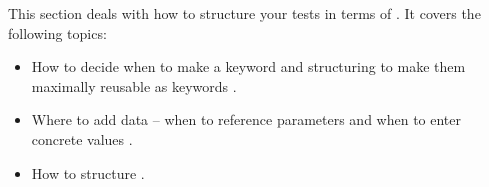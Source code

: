 This section deals with how to structure your tests in terms of . It covers the following topics:

\begin{itemize}
\item How to decide when to make a keyword and structuring \gdcases{} to make them maximally reusable as keywords .
\item Where to add data -- when to reference parameters and when to enter concrete values . 
\item How to structure \gdsuites{} .
\end{itemize}



